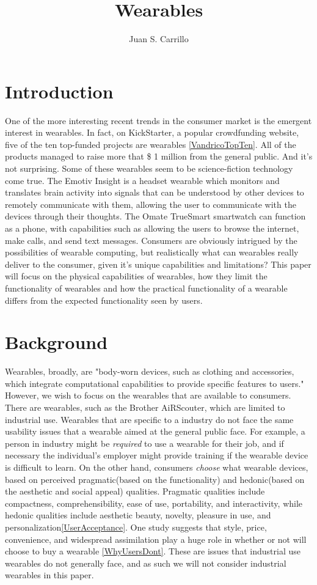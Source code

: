 \documentclass[11pt]{article}
\title{Wearables}
\author{Juan S. Carrillo}
\begin{document}
\maketitle
\section{Introduction}
One of the more interesting recent trends in the consumer market is the emergent interest in wearables. In fact, on KickStarter, a popular crowdfunding website, five of the ten top-funded projects are wearables \ref{VandricoTopTen}. All of the products managed to raise more that \$ 1 million from the general public. And it's not surprising. Some of these wearables seem to be science-fiction technology come true. The Emotiv Insight is a headset wearable which monitors and translates brain activity into signals that can be understood by other devices to remotely communicate with them, allowing the user to communicate with the devices through their thoughts. The Omate TrueSmart smartwatch can function as a phone, with capabilities such as allowing the users to browse the internet, make calls, and send text messages. Consumers are obviously intrigued by the possibilities of wearable computing, but realistically what can wearables really deliver to the consumer, given it's unique capabilities and limitations? This paper will focus on the physical capabilities of wearables, how they limit the functionality of wearables and how the practical functionality of a wearable differs from the expected functionality seen by users.
\section{Background}
Wearables, broadly, are "body-worn devices, such as clothing and accessories, which integrate computational capabilities to provide specific features to users." However, we wish to focus on the wearables that are available to consumers. There are wearables, such as the Brother AiRScouter, which are limited to industrial use. Wearables that are specific to a industry do not face the same usability issues that a wearable aimed at the general public face. For example, a person in industry might be \textit{required} to use a wearable for their job, and if necessary the individual's employer might provide training if the wearable device is difficult to learn. On the other hand, consumers \textit{choose} what wearable devices, based on perceived pragmatic(based on the functionality) and hedonic(based on the aesthetic and social appeal) qualities. Pragmatic qualities include compactness, comprehensibility, ease of use, portability, and interactivity, while hedonic qualities include aesthetic beauty, novelty, pleasure in use, and personalization\ref{UserAcceptance}. One study suggests that  style, price, convenience, and widespread assimilation play a huge role in whether or not will choose to buy a wearable \ref{WhyUsersDont}. These are issues that industrial use wearables do not generally face, and as such we will not consider industrial wearables in this paper.
\end{document}
